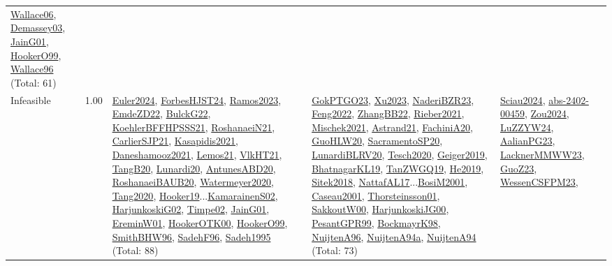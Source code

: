 {\begin{longtable}{p{3cm}r>{\raggedright\arraybackslash}p{6cm}>{\raggedright\arraybackslash}p{6cm}>{\raggedright\arraybackslash}p{8cm}}
\hyperref[detail:Wallace06]{Wallace06}, \hyperref[detail:Demassey03]{Demassey03}, \hyperref[detail:JainG01]{JainG01}, \hyperref[detail:HookerO99]{HookerO99}, \hyperref[detail:Wallace96]{Wallace96} (Total: 61)\\
\index{Infeasible}\index{Concepts!Infeasible}Infeasible &  1.00 & \hyperref[detail:Euler2024]{Euler2024}, \hyperref[detail:ForbesHJST24]{ForbesHJST24}, \hyperref[detail:Ramos2023]{Ramos2023}, \hyperref[detail:EmdeZD22]{EmdeZD22}, \hyperref[detail:BulckG22]{BulckG22}, \hyperref[detail:KoehlerBFFHPSSS21]{KoehlerBFFHPSSS21}, \hyperref[detail:RoshanaeiN21]{RoshanaeiN21}, \hyperref[detail:CarlierSJP21]{CarlierSJP21}, \hyperref[detail:Kasapidis2021]{Kasapidis2021}, \hyperref[detail:Daneshamooz2021]{Daneshamooz2021}, \hyperref[detail:Lemos21]{Lemos21}, \hyperref[detail:VlkHT21]{VlkHT21}, \hyperref[detail:TangB20]{TangB20}, \hyperref[detail:Lunardi20]{Lunardi20}, \hyperref[detail:AntunesABD20]{AntunesABD20}, \hyperref[detail:RoshanaeiBAUB20]{RoshanaeiBAUB20}, \hyperref[detail:Watermeyer2020]{Watermeyer2020}, \hyperref[detail:Tang2020]{Tang2020}, \hyperref[detail:Hooker19]{Hooker19}...\hyperref[detail:KamarainenS02]{KamarainenS02}, \hyperref[detail:HarjunkoskiG02]{HarjunkoskiG02}, \hyperref[detail:Timpe02]{Timpe02}, \hyperref[detail:JainG01]{JainG01}, \hyperref[detail:EreminW01]{EreminW01}, \hyperref[detail:HookerOTK00]{HookerOTK00}, \hyperref[detail:HookerO99]{HookerO99}, \hyperref[detail:SmithBHW96]{SmithBHW96}, \hyperref[detail:SadehF96]{SadehF96}, \hyperref[detail:Sadeh1995]{Sadeh1995} (Total: 88) & \hyperref[detail:GokPTGO23]{GokPTGO23}, \hyperref[detail:Xu2023]{Xu2023}, \hyperref[detail:NaderiBZR23]{NaderiBZR23}, \hyperref[detail:Feng2022]{Feng2022}, \hyperref[detail:ZhangBB22]{ZhangBB22}, \hyperref[detail:Rieber2021]{Rieber2021}, \hyperref[detail:Mischek2021]{Mischek2021}, \hyperref[detail:Astrand21]{Astrand21}, \hyperref[detail:FachiniA20]{FachiniA20}, \hyperref[detail:GuoHLW20]{GuoHLW20}, \hyperref[detail:SacramentoSP20]{SacramentoSP20}, \hyperref[detail:LunardiBLRV20]{LunardiBLRV20}, \hyperref[detail:Tesch2020]{Tesch2020}, \hyperref[detail:Geiger2019]{Geiger2019}, \hyperref[detail:BhatnagarKL19]{BhatnagarKL19}, \hyperref[detail:TanZWGQ19]{TanZWGQ19}, \hyperref[detail:He2019]{He2019}, \hyperref[detail:Sitek2018]{Sitek2018}, \hyperref[detail:NattafAL17]{NattafAL17}...\hyperref[detail:BosiM2001]{BosiM2001}, \hyperref[detail:Caseau2001]{Caseau2001}, \hyperref[detail:Thorsteinsson01]{Thorsteinsson01}, \hyperref[detail:SakkoutW00]{SakkoutW00}, \hyperref[detail:HarjunkoskiJG00]{HarjunkoskiJG00}, \hyperref[detail:PesantGPR99]{PesantGPR99}, \hyperref[detail:BockmayrK98]{BockmayrK98}, \hyperref[detail:NuijtenA96]{NuijtenA96}, \hyperref[detail:NuijtenA94a]{NuijtenA94a}, \hyperref[detail:NuijtenA94]{NuijtenA94} (Total: 73) & \hyperref[detail:Sciau2024]{Sciau2024}, \hyperref[detail:abs-2402-00459]{abs-2402-00459}, \hyperref[detail:Zou2024]{Zou2024}, \hyperref[detail:LuZZYW24]{LuZZYW24}, \hyperref[detail:AalianPG23]{AalianPG23}, \hyperref[detail:LacknerMMWW23]{LacknerMMWW23}, \hyperref[detail:GuoZ23]{GuoZ23}, \hyperref[detail:WessenCSFPM23]{WessenCSFPM23}, 
\end{longtable}}
